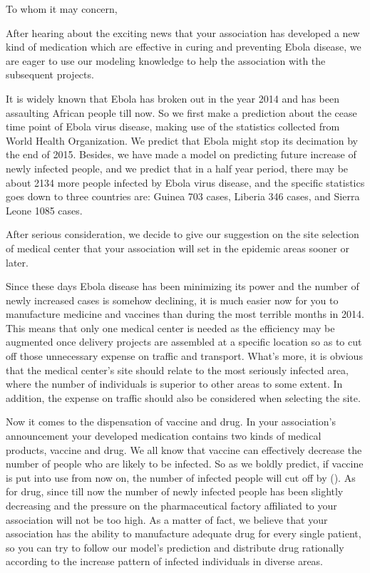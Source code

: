 \documentclass{letter}
\begin{document}
\begin{letter}{}
\opening{To whom it may concern,}


    After hearing about the exciting news that your association has developed a new kind of medication which are effective in curing and preventing Ebola disease, we are eager to use our modeling knowledge to help the association with the subsequent projects. 
    
    It is widely known that Ebola has broken out in the year 2014 and has been assaulting African people till now. So we first make a prediction about the cease time point of Ebola virus disease, making use of the statistics collected from World Health Organization. We predict that Ebola might stop its decimation by the end of 2015. Besides, we have made a model on predicting future increase of newly infected people, and we predict that in a half year period, there may be about 2134 more people infected by Ebola virus disease, and the specific statistics goes down to three countries are: Guinea 703 cases, Liberia 346 cases, and Sierra Leone 1085 cases.
    
    After serious consideration, we decide to give our suggestion on the site selection of medical center that your association will set in the epidemic areas sooner or later.
    
    Since these days Ebola disease has been minimizing its power and the number of newly increased cases is somehow declining, it is much easier now for you to manufacture medicine and vaccines than during the most terrible months in 2014. This means that only one medical center is needed as the efficiency may be augmented once delivery projects are assembled at a specific location so as to cut off those unnecessary expense on traffic and transport. What's more, it is obvious that the medical center's site should relate to the most seriously infected area, where the number of individuals is superior to other areas to some extent. In addition, the expense on traffic should also be considered when selecting the site. 
    
    Now it comes to the dispensation of vaccine and drug. In your association's announcement your developed medication contains two kinds of medical products, vaccine and drug. We all know that vaccine can effectively decrease the number of people who are likely to be infected. So as we boldly predict, if vaccine is put into use from now on, the number of infected people will cut off by (). As for drug, since till now the number of newly infected people has been slightly decreasing and the pressure on the pharmaceutical factory affiliated to your association will not be too high. As a matter of fact, we believe that your association has the ability to manufacture adequate drug for every single patient, so you can try to follow our model's prediction and distribute drug rationally according to the increase pattern of infected individuals in diverse areas.
    

\end{letter}
\end{document}
